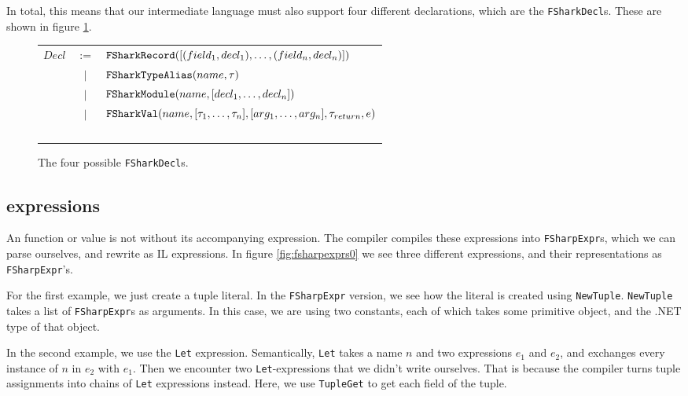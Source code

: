 In total, this means that our intermediate language must also support four
different declarations, which are the \texttt{FSharkDecl}s. These are shown in
figure \ref{fig:fsharkdecls}.

\begin{figure}
  \centering
\begin{tabular}{@{}l c l}%
  $Decl$ & $:=$    & $\text{\ttfamily FSharkRecord}([(field_1, decl_1),\ldots,(field_n, decl_n)])$ \\
         & $\vert$ & $\text{\ttfamily FSharkTypeAlias}(name, \tau)$ \\
         & $\vert$ & $\text{\ttfamily FSharkModule}(name, [decl_1,\ldots, decl_n])$\\
         & $\vert$ & $\text{\ttfamily FSharkVal}(name, [\tau_1, \ldots, \tau_n], [arg_1, \ldots, arg_n], \tau_{return}, e)$\\
  ~ \\
\end{tabular}
\caption{The four possible \texttt{FSharkDecl}s.}
\label{fig:fsharkdecls}
\end{figure}

\subsection{\fsharp{} expressions}
\label{sec:fsharpexprs}
An \fsharp{} function or value is not without its accompanying \fsharp{}
expression. The \fsharp{} compiler compiles these \fsharp{} expressions into
\texttt{FSharpExpr}s, which we can parse ourselves, and rewrite as \fshark{}IL expressions.
In figure \ref{fig:fsharpexprs0} we see three different \fsharp{} expressions,
and their representations as \texttt{FSharpExpr}'s.

For the first example, we just create a tuple literal. In the
\texttt{FSharpExpr} version, we see how the literal is created using
\texttt{NewTuple}. \texttt{NewTuple} takes a list of \texttt{FSharpExpr}s as
arguments. In this case, we are using two constants, each of which takes some
primitive object, and the .NET type of that object.

In the second example, we use the \texttt{Let} expression. Semantically, \texttt{Let} takes a
name $n$ and two expressions $e_1$ and $e_2$, and exchanges every instance of
$n$ in $e_2$ with $e_1$.
Then we encounter two \texttt{Let}-expressions that we didn't write ourselves.
That is because the \fsharp{} compiler turns tuple assignments into chains of
\texttt{Let} expressions instead. Here, we use \texttt{TupleGet} to get each
field of the tuple.

